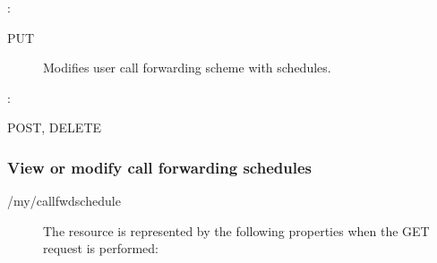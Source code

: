 \documentclass[letterpaper,10pt,english]{sphinxmanual}
\begin{document}
:

\begin{sphinxVerbatim}[commandchars=\\\{\}]
\end{sphinxVerbatim}
\begin{description}
\item[{ PUT}] \leavevmode
Modifies user call forwarding scheme with schedules.

\end{description}

:

\begin{sphinxVerbatim}[commandchars=\\\{\}]
\end{sphinxVerbatim}

 POST, DELETE


\subsubsection{View or modify call forwarding schedules}
\label{\detokenize{restapi:view-or-modify-call-forwarding-schedules}}
 /my/callfwdschedule
\begin{description}
\item[{}] \leavevmode
The resource is represented by the following properties when the GET request is performed:

\end{description}
\end{document}

